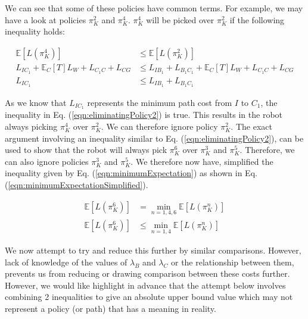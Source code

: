 \documentclass[a4paper,12pt]{article}
\begin{document}
			We can see that some of these policies have common terms. For example, we may have a look at policies $\pi_{K}^{2}$ and $\pi_{K}^{4}$. $\pi_{K}^{4}$ will be picked over $\pi_{K}^{2}$ if the following inequality holds:
			
			\begin{equation}
			\begin{split}
			\mathbb{E}\left[L\left(\pi_{K}^{4}\right)\right] &\leq \mathbb{E}\left[L\left(\pi_{K}^{2}\right)\right] \\
			L_{IC_1} + \mathbb{E}_{C}\left[T\right]L_W + L_{C_1C} + L_{CG} &\leq L_{IB_1} + L_{B_1C_1} + \mathbb{E}_{C}\left[T\right]L_W + L_{C_1C} + L_{CG} \\
			L_{IC_1} &\leq L_{IB_1} + L_{B_1C_1}
			\end{split}
			\label{eqn:eliminatingPolicy2}
			\end{equation}
			
			As we know that $L_{IC_1}$ represents the minimum path cost from $I$ to $C_1$, the inequality in Eq. (\ref{eqn:eliminatingPolicy2}) is true. This results in the robot always picking $\pi_{K}^{4}$ over $\pi_{K}^{2}$. We can therefore ignore policy $\pi_{K}^{2}$. The exact argument involving an inequality similar to Eq. (\ref{eqn:eliminatingPolicy2}), can be used to show that the robot will always pick $\pi_{K}^{6}$ over $\pi_{K}^{3}$ and $\pi_{K}^{5}$. Therefore, we can also ignore policies $\pi_{K}^{3}$ and $\pi_{K}^{5}$. We therefore now have, simplified the inequality given by Eq. (\ref{eqn:minimumExpectation}) as shown in Eq. (\ref{eqn:minimumExpectationSimplified}).
			
			\begin{equation}
			\begin{split}
				\mathbb{E}\left[L\left(\pi_{K}^{6}\right)\right] &= \min_{n=1,4,6} \mathbb{E}\left[L\left(\pi_{K}^{n}\right)\right] \\ 
				\mathbb{E}\left[L\left(\pi_{K}^{6}\right)\right] &\leq \min_{n=1,4} \mathbb{E}\left[L\left(\pi_{K}^{n}\right)\right]
			\end{split}
			\label{eqn:minimumExpectationSimplified}
			\end{equation}
			
			We now attempt to try and reduce this further by similar comparisons. However, lack of knowledge of the values of $ \lambda_B $ and $ \lambda_C $ or the relationship between them, prevents us from reducing or drawing comparison between these costs further. However, we would like highlight in advance that the attempt below involves combining 2 inequalities to give an absolute upper bound value which may not represent a policy (or path) that has a meaning in reality.
			
\end{document}
